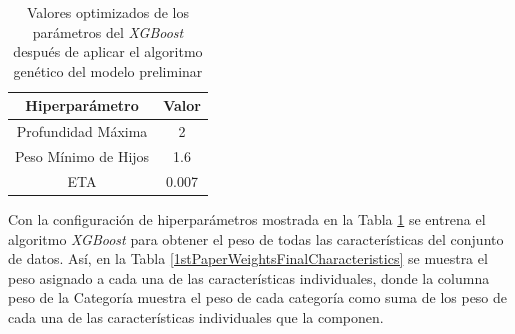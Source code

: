\begin{table}[h]
	\caption{Valores optimizados de los parámetros del \textit{XGBoost} después de aplicar el algoritmo genético del modelo preliminar}
	\centering
	\begin{tabular}{ |c|c| } 
		\hline
		\textbf{Hiperparámetro} & \textbf{Valor}\\
		\hline
		Profundidad Máxima & 2 \\
		Peso Mínimo de Hijos & 1.6 \\ 
		ETA & 0.007 \\
		\hline
	\end{tabular}

	\label{BestGASolutionTable}
\end{table}


Con la configuración de hiperparámetros mostrada en la Tabla \ref{BestGASolutionTable} se entrena el algoritmo \textit{XGBoost} para obtener el peso de todas las  características del conjunto de datos. Así, en la Tabla \ref{1stPaperWeightsFinalCharacteristics} se muestra el peso asignado a cada una de las características individuales, donde la columna peso de la Categoría muestra el peso de cada categoría como suma de los peso de cada una de las características individuales que la componen.


